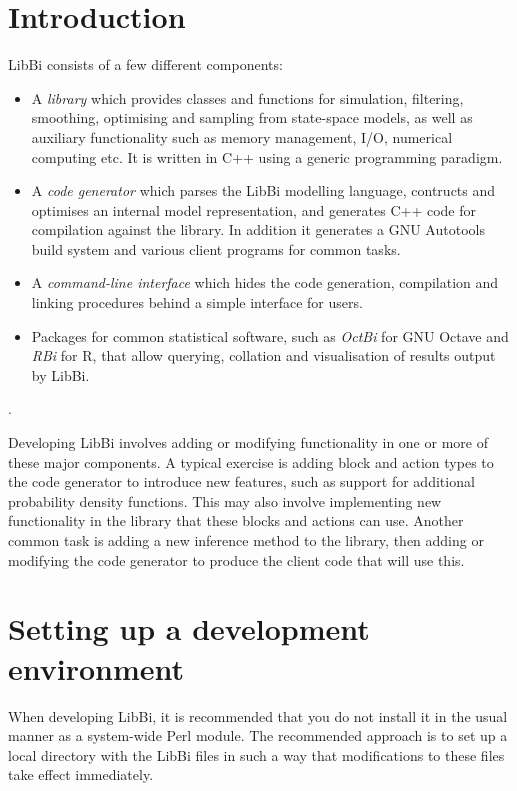 \section{Introduction}

LibBi consists of a few different components:
\begin{itemize}
\item A \emph{library} which provides classes and functions for simulation,
  filtering, smoothing, optimising and sampling from state-space models, as
  well as auxiliary functionality such as memory management, I/O, numerical
  computing etc. It is written in C++ using a generic programming paradigm.
\item A \emph{code generator} which parses the LibBi modelling language,
  contructs and optimises an internal model representation, and generates C++
  code for compilation against the library. In addition it generates a GNU
  Autotools build system and various client programs for common tasks.
\item A \emph{command-line interface} which hides the code generation,
  compilation and linking procedures behind a simple interface for users.
\item Packages for common statistical software, such as \emph{OctBi} for GNU
  Octave and \emph{RBi} for R, that allow querying, collation and
  visualisation of results output by LibBi.
\end{itemize}.

Developing LibBi involves adding or modifying functionality in one or more of
these major components. A typical exercise is adding block
and action types to the code generator to introduce new features, such as
support for additional probability density
functions. This may also involve implementing new
functionality in the library that these blocks and actions can use. Another
common task is adding a new inference method to the library, then adding or
modifying the code generator to produce the client code that will use this.

\section{Setting up a development environment}

When developing LibBi, it is recommended that you do not install it in the
usual manner as a system-wide Perl module. The recommended approach is to set
up a local directory with the LibBi files in such a way that modifications to
these files take effect immediately.

